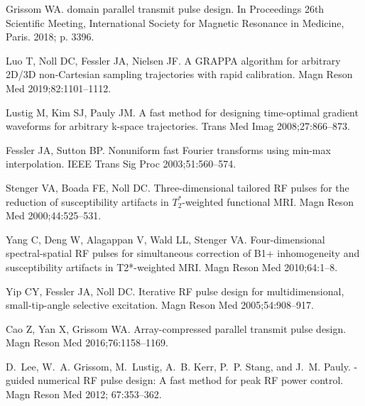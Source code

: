 \documentclass[11pt]{article}
\begin{document}
\begin{thebibliography}{10}
Grissom WA.
 domain parallel transmit pulse design.
\newblock In Proceedings 26th Scientific Meeting, International Society for
  Magnetic Resonance in Medicine, Paris. 2018;\hspace{0pt} p. 3396.

Luo T, Noll DC, Fessler JA, Nielsen JF.
\newblock A {GRAPPA} algorithm for arbitrary {2D/3D} non-{Cartesian} sampling
  trajectories with rapid calibration.
\newblock Magn Reson Med 2019;\hspace{0pt}82:1101--1112.

Lustig M, Kim SJ, Pauly JM.
\newblock A fast method for designing time-optimal gradient waveforms for
  arbitrary k-space trajectories.
 Trans Med Imag 2008;\hspace{0pt}27:866--873.

Fessler JA, Sutton BP.
\newblock Nonuniform fast {Fourier} transforms using min-max interpolation.
\newblock IEEE Trans Sig Proc 2003;\hspace{0pt}51:560--574.

Stenger VA, Boada FE, Noll DC.
\newblock Three-dimensional tailored {RF} pulses for the reduction of
  susceptibility artifacts in {$T_2^*$}-weighted functional {MRI}.
\newblock Magn Reson Med 2000;\hspace{0pt}44:525--531.

Yang C, Deng W, Alagappan V, Wald LL, Stenger VA.
\newblock Four-dimensional spectral-spatial {RF} pulses for simultaneous
  correction of {B1+} inhomogeneity and susceptibility artifacts in
  {T2*}-weighted {MRI}.
\newblock Magn Reson Med 2010;\hspace{0pt}64:1--8.

Yip CY, Fessler JA, Noll DC.
\newblock Iterative {RF} pulse design for multidimensional, small-tip-angle
  selective excitation.
\newblock Magn Reson Med 2005;\hspace{0pt}54:908--917.

Cao Z, Yan X, Grissom WA.
\newblock Array-compressed parallel transmit pulse design.
\newblock Magn Reson Med 2016;\hspace{0pt}76:1158--1169.

D.~Lee, W.~A. Grissom, M.~Lustig, A.~B. Kerr, P.~P. Stang, and J.~M. Pauly.
-guided numerical {RF} pulse design: A fast method for peak
  {RF} power control.
\newblock Magn Reson Med 2012; 67:353--362.


\end{thebibliography}
\end{document}
